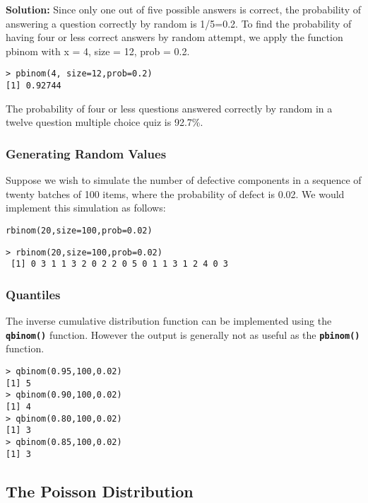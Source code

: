 \textbf{Solution:} Since only one out of five possible answers is correct, the probability of answering a question correctly by random is 1/5=0.2. To find the probability of having four or less correct answers by random attempt, we apply the function pbinom with x = 4, size = 12, prob = 0.2. 

\begin{verbatim}
> pbinom(4, size=12,prob=0.2) 
[1] 0.92744 
\end{verbatim}

The probability of four or less questions answered correctly by random in a twelve question multiple choice quiz is 92.7\%. 
 
\subsubsection{Generating Random Values}

Suppose we wish to simulate the number of defective components in a sequence of twenty batches of 100 items, where the probability of defect is 0.02. We would implement this simulation as follows:

\begin{framed}
\begin{verbatim}
rbinom(20,size=100,prob=0.02)
\end{verbatim}
\end{framed}

\begin{verbatim}
> rbinom(20,size=100,prob=0.02)
 [1] 0 3 1 1 3 2 0 2 2 0 5 0 1 1 3 1 2 4 0 3
\end{verbatim}
\subsubsection{Quantiles}
The inverse cumulative distribution function can be implemented using the \texttt{\textbf{qbinom()}} function.
However the output is generally not as useful as the \texttt{\textbf{pbinom()}} function.
\begin{verbatim}
> qbinom(0.95,100,0.02)
[1] 5
> qbinom(0.90,100,0.02)
[1] 4
> qbinom(0.80,100,0.02)
[1] 3
> qbinom(0.85,100,0.02)
[1] 3
\end{verbatim}

\newpage
\subsection{The Poisson Distribution}

